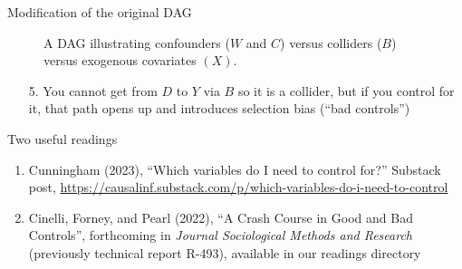 \documentclass{beamer}
\begin{document}
\begin{frame}{Modification of the original DAG}

\begin{figure}
\begin{center}
\caption{A DAG illustrating confounders ($W$ and $C$) versus colliders ($B$) versus exogenous covariates $(X)$.}
\label{fig:backdoor_dag}
\end{center}
\end{figure}

\begin{enumerate}
\item[5. ] You cannot get from $D$ to $Y$ via $B$ so it is a collider, but if you control for it, that path opens up and introduces selection bias (``bad controls'')
\end{enumerate}


\end{frame}

\begin{frame}{Two useful readings}

\begin{enumerate}
\item Cunningham (2023), ``Which variables do I need to control for?'' Substack post, \url{https://causalinf.substack.com/p/which-variables-do-i-need-to-control}
\item Cinelli, Forney, and Pearl (2022), ``A Crash Course in Good and Bad Controls'', forthcoming in \emph{Journal Sociological Methods and Research} (previously technical report R-493), available in our readings directory
\end{enumerate}

\end{frame}
\end{document}
